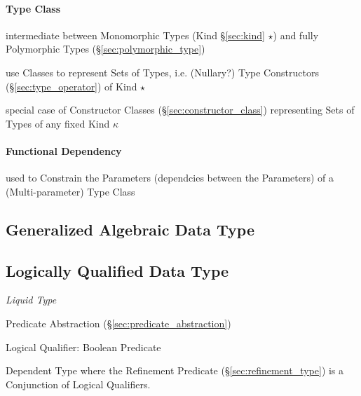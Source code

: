 \paragraph{Type Class}\label{sec:type_class}\hfill

\cite{jones95}

intermediate between Monomorphic Types (Kind \S\ref{sec:kind} $\star$)
and fully Polymorphic Types (\S\ref{sec:polymorphic_type})

use Classes to represent Sets of Types, i.e. (Nullary?) Type
Constructors (\S\ref{sec:type_operator}) of Kind $\star$

special case of Constructor Classes (\S\ref{sec:constructor_class})
representing Sets of Types of any fixed Kind $\kappa$



\paragraph{Functional Dependency}\label{sec:functional_dependency}\hfill

used to Constrain the Parameters (dependcies between the Parameters)
of a (Multi-parameter) Type Class




\subsection{Generalized Algebraic Data Type}\label{sec:gadt}

\subsection{Logically Qualified Data Type}
\label{sec:logically_qualified}

\cite{rondon-kawaguchi-jhala08}

\emph{Liquid Type}

Predicate Abstraction (\S\ref{sec:predicate_abstraction})

Logical Qualifier: Boolean Predicate

Dependent Type where the Refinement Predicate
(\S\ref{sec:refinement_type}) is a Conjunction of Logical Qualifiers.

